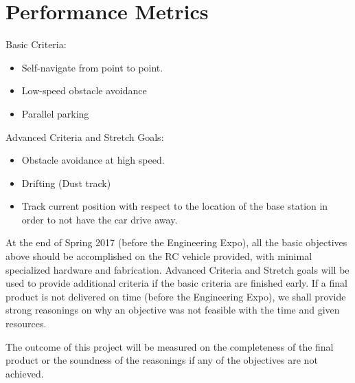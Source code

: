 \documentclass[draftclsnofoot,onecolumn,10pt]{IEEEtran}
\begin{document}
\section{Performance Metrics}
Basic Criteria:
\begin{itemize}
	\item Self-navigate from point to point.
	\item Low-speed obstacle avoidance
	\item Parallel parking
\end{itemize}
 Advanced Criteria and Stretch Goals:
 \begin{itemize}
	\item Obstacle avoidance at high speed.
	\item Drifting (Dust track) 
	\item Track current position with respect to the location of the base station in
		order to not have the car drive away.
\end{itemize}
At the end of Spring 2017 (before the Engineering Expo), all the basic
objectives above should be accomplished on the RC vehicle provided, with minimal
specialized hardware and fabrication. Advanced Criteria and Stretch goals will
be used to provide additional criteria if the basic criteria are finished early.
If a final product is not delivered on time (before the Engineering Expo), we
shall provide strong reasonings on why an objective was not feasible with the
time and given resources.

The outcome of this project will be measured on the completeness of the final
product or the soundness of the reasonings if any of the objectives are not
achieved.
\end{document}
